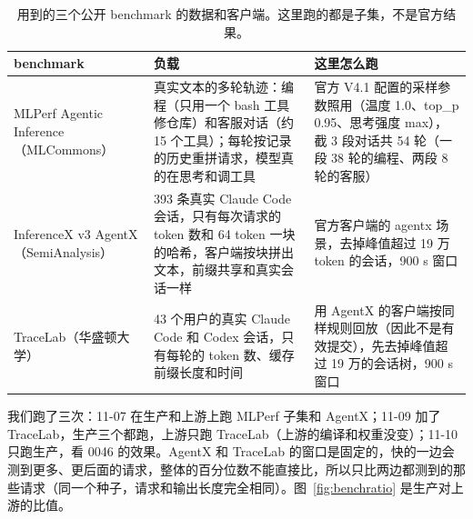 \documentclass[11pt,a4paper]{article}
\begin{document}
\begin{table}[h]
  \centering
  \small
  \caption{用到的三个公开 benchmark 的数据和客户端。这里跑的都是子集，不是官方结果。}
  \label{tab:benchmarks}
  \begin{tabularx}{\textwidth}{@{}>{\raggedright\arraybackslash}p{2.6cm} X X@{}}
    \toprule
    benchmark & 负载 & 这里怎么跑 \\
    \midrule
    MLPerf Agentic Inference（MLCommons）~\cite{mlperf} & 真实文本的多轮轨迹：编程（只用一个 bash 工具修仓库）和客服对话（约 15 个工具）；每轮按记录的历史重拼请求，模型真的在思考和调工具 & 官方 V4.1 配置的采样参数照用（温度 1.0、top\_p 0.95、思考强度 max），截 3 段对话共 54 轮（一段 38 轮的编程、两段 8 轮的客服） \\
    InferenceX v3 AgentX（SemiAnalysis）~\cite{agentx} & 393 条真实 Claude Code 会话，只有每次请求的 token 数和 64 token 一块的哈希，客户端按块拼出文本，前缀共享和真实会话一样 & 官方客户端的 agentx 场景，去掉峰值超过 19 万 token 的会话，900 s 窗口 \\
    TraceLab（华盛顿大学）~\cite{tracelab} & 43 个用户的真实 Claude Code 和 Codex 会话，只有每轮的 token 数、缓存前缀长度和时间 & 用 AgentX 的客户端按同样规则回放（因此不是有效提交），先去掉峰值超过 19 万的会话树，900 s 窗口 \\
    \bottomrule
  \end{tabularx}
\end{table}

我们跑了三次：11-07 在生产和上游上跑 MLPerf 子集和 AgentX；11-09 加了 TraceLab，生产三个都跑，上游只跑 TraceLab（上游的编译和权重没变）；11-10 只跑生产，看 0046 的效果。AgentX 和 TraceLab 的窗口是固定的，快的一边会测到更多、更后面的请求，整体的百分位数不能直接比，所以只比两边都测到的那些请求（同一个种子，请求和输出长度完全相同）。图~\ref{fig:benchratio} 是生产对上游的比值。
\end{document}
